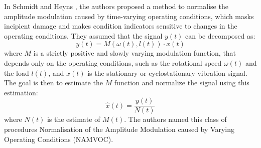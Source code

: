 In Schmidt and Heyns \cite{SCHMIDT2020106964}, the authors proposed a method to normalise the amplitude modulation caused by time-varying operating conditions, which masks incipient damage and makes condition indicators sensitive to changes in the operating conditions. They assumed that the signal $y(t)$ can be decomposed as:
\begin{equation}
    y(t) = M\left(\omega(t), l(t)\right) \cdot x(t)
\end{equation}
where $M$ is a strictly positive and slowly varying modulation function, that depends only on the operating conditions, such as the rotational speed $\omega(t)$ and the load $l(t)$, and $x(t)$ is the stationary or cyclostationary vibration signal. The goal is then to estimate the $M$ function and normalize the signal using this estimation:
\begin{equation}
    \hat{x}(t) = \frac{y(t)}{N(t)}
\end{equation}
where $N(t)$ is the estimate of $M(t)$. The authors named this class of procedures Normalisation of the Amplitude Modulation caused by Varying Operating Conditions (NAMVOC).

